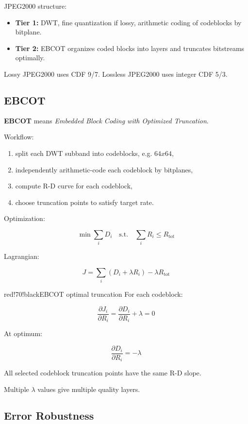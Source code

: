 JPEG2000 structure:

\begin{itemize}
  \item \textbf{Tier 1:} DWT, fine quantization if lossy, arithmetic coding of codeblocks by bitplane.
  \item \textbf{Tier 2:} EBCOT organizes coded blocks into layers and truncates bitstreams optimally.
\end{itemize}

Lossy JPEG2000 uses CDF 9/7. Lossless JPEG2000 uses integer CDF 5/3.

\subsection{EBCOT}

\textbf{EBCOT} means \textit{Embedded Block Coding with Optimized Truncation}.

Workflow:

\begin{enumerate}
  \item split each DWT subband into codeblocks, e.g. $64x64$,
  \item independently arithmetic-code each codeblock by bitplanes,
  \item compute R-D curve for each codeblock,
  \item choose truncation points to satisfy target rate.
\end{enumerate}

Optimization:

\[
\min\sum_i D_i
\quad\text{s.t.}\quad
\sum_i R_i\leq R_{\text{tot}}
\]

Lagrangian:

\[
J=\sum_i(D_i+\lambda R_i)-\lambda R_{\text{tot}}
\]

\begin{calloutbox}{red!70!black}{EBCOT optimal truncation}
For each codeblock:

\[
\frac{\partial J_i}{\partial R_i}
=
\frac{\partial D_i}{\partial R_i}+\lambda=0
\]

At optimum:

\[
\frac{\partial D_i}{\partial R_i}=-\lambda
\]

All selected codeblock truncation points have the same R-D slope.
\end{calloutbox}

Multiple $\lambda$ values give multiple quality layers.

\subsection{Error Robustness}

